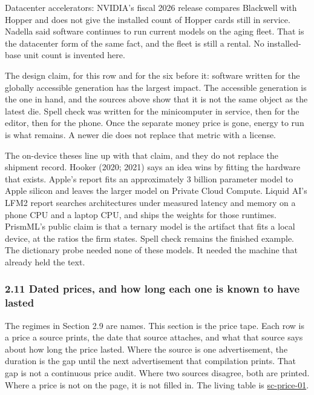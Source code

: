 \documentclass[
  10pt,
]{article}
\newcounter{none} %
\begin{document}
Datacenter accelerators: NVIDIA's fiscal 2026 release compares Blackwell
with Hopper and does not give the installed count of Hopper cards still
in service. Nadella said software continues to run current models on the
aging fleet. That is the datacenter form of the same fact, and the fleet
is still a rental. No installed-base unit count is invented here.

The design claim, for this row and for the six before it: software
written for the globally accessible generation has the largest impact.
The accessible generation is the one in hand, and the sources above show
that it is not the same object as the latest die. Spell check was
written for the minicomputer in service, then for the editor, then for
the phone. Once the separate money price is gone, energy to run is what
remains. A newer die does not replace that metric with a license.

The on-device theses line up with that claim, and they do not replace
the shipment record. Hooker (2020; 2021) says an idea wins by fitting
the hardware that exists. Apple's report fits an approximately 3 billion
parameter model to Apple silicon and leaves the larger model on Private
Cloud Compute. Liquid AI's LFM2 report searches architectures under
measured latency and memory on a phone CPU and a laptop CPU, and ships
the weights for those runtimes. PrismML's public claim is that a ternary
model is the artifact that fits a local device, at the ratios the firm
states. Spell check remains the finished example. The dictionary probe
needed none of these models. It needed the machine that already held the
text.

\subsubsection{2.11 Dated prices, and how long each one is known to have
lasted}\label{dated-prices-and-how-long-each-one-is-known-to-have-lasted}

The regimes in Section 2.9 are names. This section is the price tape.
Each row is a price a source prints, the date that source attaches, and
what that source says about how long the price lasted. Where the source
is one advertisement, the duration is the gap until the next
advertisement that compilation prints. That gap is not a continuous
price audit. Where two sources disagree, both are printed. Where a price
is not on the page, it is not filled in. The living table is
\href{https://research.openie.dev/living/spellcheck/\#sc-price-01}{sc-price-01}.
\end{document}
